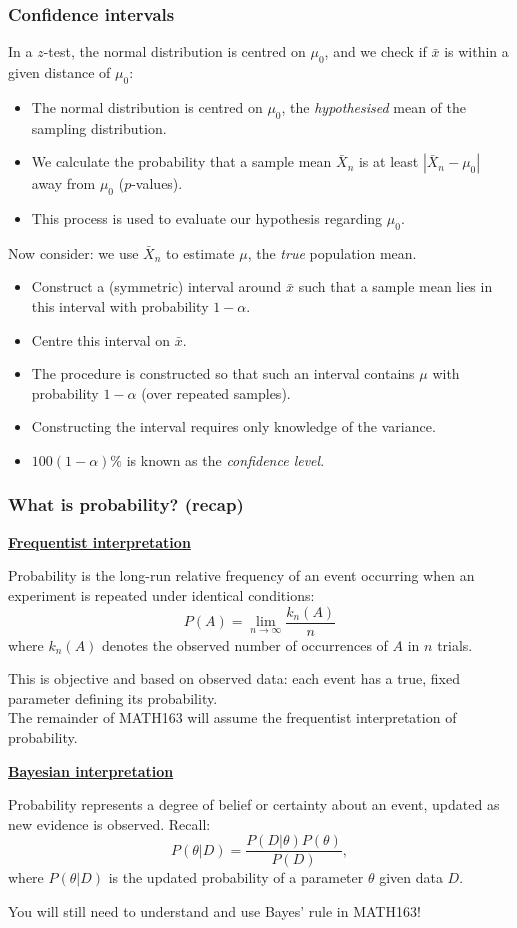 \documentclass[t,8pt]{beamer}
\begin{document}
\begin{frame}
	\frametitle{Confidence intervals}
	In a $z$-test, the normal distribution is centred on $\mu_0$, and we check if $\bar x$ is within a given distance of $\mu_0$:
	\begin{itemize}
		\item The normal distribution is centred on $\mu_0$, the {\it hypothesised} mean of the sampling distribution.
		\item We calculate the probability that a sample mean $\bar X_n$ is at least $|\bar X_n-\mu_0|$ away from $\mu_0$ ($p$-values).
		\item This process is used to evaluate our hypothesis regarding $\mu_0$.
	\end{itemize}
	Now consider: we use $\bar X_n$ to estimate $\mu$, the {\it true} population mean.
	\begin{itemize}
		\item Construct a (symmetric) interval around $\bar x$ such that a sample mean lies in this interval with probability $1-\alpha$.
		\item Centre this interval on $\bar x$.
		\item The procedure is constructed so that such an interval contains $\mu$ with probability $1-\alpha$ (over repeated samples).
		\item Constructing the interval requires only knowledge of the variance.
		\item $100(1-\alpha)\%$ is known as the {\it confidence level}.
	\end{itemize}
\end{frame}

\begin{frame}
	\frametitle{What is probability? (recap)}
	{\bf\underline{Frequentist interpretation}} \par
	Probability is the long-run relative frequency of an event occurring when an experiment is repeated under identical conditions:
	\[
	P(A)=\lim_{n\rightarrow\infty}\frac{k_n(A)}{n}
	\]
	where $k_n(A)$ denotes the observed number of occurrences of $A$ in $n$ trials. \par
	{\small\color{NavyBlue}
		This is objective and based on observed data: each event has a true, fixed parameter defining its probability. \\
		The remainder of MATH163 will assume the frequentist interpretation of probability.
	} \par
	{\bf\underline{Bayesian interpretation}} \par
	Probability represents a degree of belief or certainty about an event, updated as new evidence is observed. Recall:
	\[
	P(\theta\vert D)=\frac{P(D\vert\theta)P(\theta)}{P(D)},
	\]
	where $P(\theta\vert D)$ is the updated probability of a parameter $\theta$ given data $D$. \par
	{\small\color{NavyBlue}
		You will still need to understand and use Bayes' rule in MATH163!
	}
\end{frame}
\end{document}
